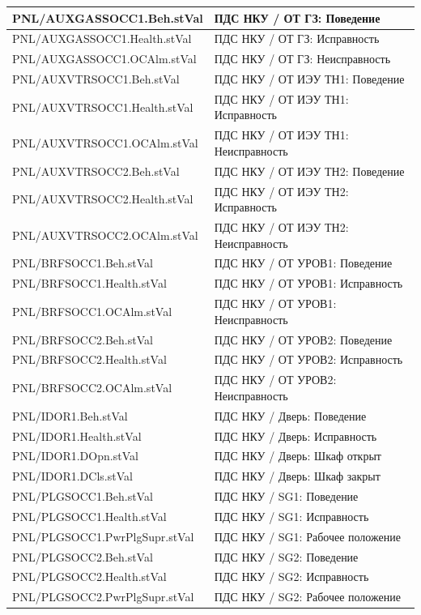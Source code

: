 \begin{longtable}{|>{\raggedright\arraybackslash}m{}|>{\raggedright\arraybackslash}m{}|}
\hline
PNL/AUXGASSOCC1.Beh.stVal & ПДС НКУ / ОТ ГЗ: Поведение \\
\hline
PNL/AUXGASSOCC1.Health.stVal & ПДС НКУ / ОТ ГЗ: Исправность \\
\hline
PNL/AUXGASSOCC1.OCAlm.stVal & ПДС НКУ / ОТ ГЗ: Неисправность \\
\hline
PNL/AUXVTRSOCC1.Beh.stVal & ПДС НКУ / ОТ ИЭУ ТН1: Поведение \\
\hline
PNL/AUXVTRSOCC1.Health.stVal & ПДС НКУ / ОТ ИЭУ ТН1: Исправность \\
\hline
PNL/AUXVTRSOCC1.OCAlm.stVal & ПДС НКУ / ОТ ИЭУ ТН1: Неисправность \\
\hline
PNL/AUXVTRSOCC2.Beh.stVal & ПДС НКУ / ОТ ИЭУ ТН2: Поведение \\
\hline
PNL/AUXVTRSOCC2.Health.stVal & ПДС НКУ / ОТ ИЭУ ТН2: Исправность \\
\hline
PNL/AUXVTRSOCC2.OCAlm.stVal & ПДС НКУ / ОТ ИЭУ ТН2: Неисправность \\
\hline
PNL/BRFSOCC1.Beh.stVal & ПДС НКУ / ОТ УРОВ1: Поведение \\
\hline
PNL/BRFSOCC1.Health.stVal & ПДС НКУ / ОТ УРОВ1: Исправность \\
\hline
PNL/BRFSOCC1.OCAlm.stVal & ПДС НКУ / ОТ УРОВ1: Неисправность \\
\hline
PNL/BRFSOCC2.Beh.stVal & ПДС НКУ / ОТ УРОВ2: Поведение \\
\hline
PNL/BRFSOCC2.Health.stVal & ПДС НКУ / ОТ УРОВ2: Исправность \\
\hline
PNL/BRFSOCC2.OCAlm.stVal & ПДС НКУ / ОТ УРОВ2: Неисправность \\
\hline
PNL/IDOR1.Beh.stVal & ПДС НКУ / Дверь: Поведение \\
\hline
PNL/IDOR1.Health.stVal & ПДС НКУ / Дверь: Исправность \\
\hline
PNL/IDOR1.DOpn.stVal & ПДС НКУ / Дверь: Шкаф открыт \\
\hline
PNL/IDOR1.DCls.stVal & ПДС НКУ / Дверь: Шкаф закрыт \\
\hline
PNL/PLGSOCC1.Beh.stVal & ПДС НКУ / SG1: Поведение \\
\hline
PNL/PLGSOCC1.Health.stVal & ПДС НКУ / SG1: Исправность \\
\hline
PNL/PLGSOCC1.PwrPlgSupr.stVal & ПДС НКУ / SG1: Рабочее положение \\
\hline
PNL/PLGSOCC2.Beh.stVal & ПДС НКУ / SG2: Поведение \\
\hline
PNL/PLGSOCC2.Health.stVal & ПДС НКУ / SG2: Исправность \\
\hline
PNL/PLGSOCC2.PwrPlgSupr.stVal & ПДС НКУ / SG2: Рабочее положение \\

\end{longtable}
